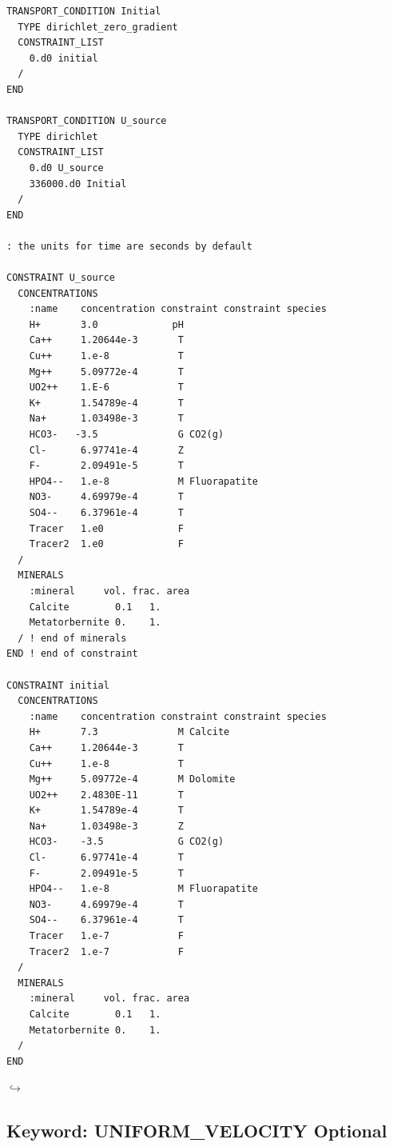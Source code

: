\documentclass[12pt]{article}
\newcommand\return{{\hfill$\hookrightarrow$}}
\begin{document}
\begin{verbatim}
TRANSPORT_CONDITION Initial
  TYPE dirichlet_zero_gradient
  CONSTRAINT_LIST
    0.d0 initial
  /
END

TRANSPORT_CONDITION U_source
  TYPE dirichlet
  CONSTRAINT_LIST
    0.d0 U_source
    336000.d0 Initial
  /
END

: the units for time are seconds by default

CONSTRAINT U_source
  CONCENTRATIONS
    :name    concentration constraint constraint species
    H+       3.0             pH
    Ca++     1.20644e-3       T
    Cu++     1.e-8            T
    Mg++     5.09772e-4       T
    UO2++    1.E-6            T
    K+       1.54789e-4       T
    Na+      1.03498e-3       T
    HCO3-   -3.5              G CO2(g)
    Cl-      6.97741e-4       Z
    F-       2.09491e-5       T
    HPO4--   1.e-8            M Fluorapatite
    NO3-     4.69979e-4       T
    SO4--    6.37961e-4       T
    Tracer   1.e0             F
    Tracer2  1.e0             F
  /
  MINERALS
    :mineral     vol. frac. area
    Calcite        0.1   1.
    Metatorbernite 0.    1.
  / ! end of minerals
END ! end of constraint

CONSTRAINT initial
  CONCENTRATIONS
    :name    concentration constraint constraint species
    H+       7.3              M Calcite
    Ca++     1.20644e-3       T
    Cu++     1.e-8            T
    Mg++     5.09772e-4       M Dolomite
    UO2++    2.4830E-11       T
    K+       1.54789e-4       T
    Na+      1.03498e-3       Z
    HCO3-    -3.5             G CO2(g)
    Cl-      6.97741e-4       T
    F-       2.09491e-5       T
    HPO4--   1.e-8            M Fluorapatite
    NO3-     4.69979e-4       T
    SO4--    6.37961e-4       T
    Tracer   1.e-7            F
    Tracer2  1.e-7            F
  /
  MINERALS
    :mineral     vol. frac. area
    Calcite        0.1   1.
    Metatorbernite 0.    1.
  /
END
\end{verbatim}

\hyperlink{target_key}{\return}


\newpage
\protect\hypertarget{target_unifvel}{}

\subsection{Keyword: UNIFORM\_VELOCITY \hfill Optional}
\end{document}
